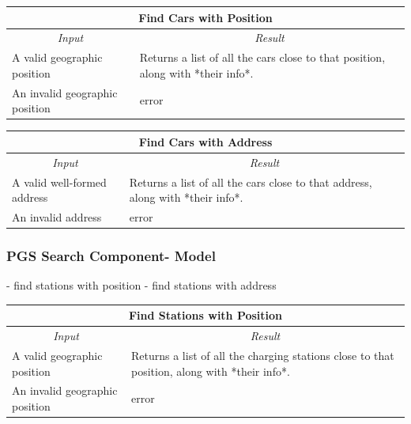 \documentclass[english]{article}
\begin{document}
\begin{center}

	\begin{tabular}{ | p{6cm} | p{6cm} | }
		\multicolumn{2}{|c|}{\textbf{Find Cars with Position}} \\
		\hline
		\multicolumn{1}{|c|}{\textit{Input}} & \multicolumn{1}{c|}{\textit{Result}} \\
		\hline
		A valid geographic position & Returns a list of all the cars close to that position, along with *their info*. \\
		\hline
		An invalid geographic position & error \\
		\hline
	\end{tabular}
\end{center}

\begin{center}

	\begin{tabular}{ | p{6cm} | p{6cm} | }
		\hline 
		\multicolumn{2}{|c|}{\textbf{Find Cars with Address}} \\
		\hline
		\multicolumn{1}{|c|}{\textit{Input}} & \multicolumn{1}{c|}{\textit{Result}} \\
		\hline
		A valid well-formed address & Returns a list of all the cars close to that address, along with *their info*. \\
		\hline
		An invalid address & error \\
		\hline
	\end{tabular}
\end{center}

\subsubsection{PGS Search Component- Model}
- find stations with position
- find stations with address


\begin{center}

	\begin{tabular}{ | p{6cm} | p{6cm} | }
		\hline 
		\multicolumn{2}{|c|}{\textbf{Find Stations with Position}} \\
		\hline
		\multicolumn{1}{|c|}{\textit{Input}} & \multicolumn{1}{c|}{\textit{Result}} \\
		\hline
		A valid geographic position & Returns a list of all the charging stations close to that position, along with *their info*. \\
		\hline
		An invalid geographic position & error \\
		\hline
	\end{tabular}
\end{center}
\end{document}
